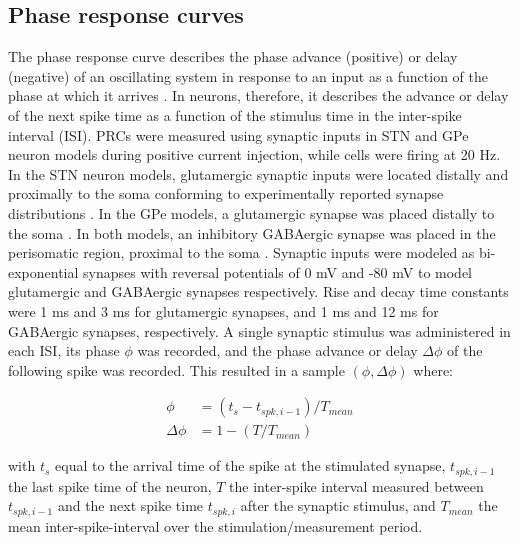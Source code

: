 \subsection{Phase response curves}
%

%
The phase response curve describes the phase advance (positive)
or delay (negative) of an oscillating system in response to an input as a function
of the phase at which it arrives \cite{gutkin_phase-response_2005}.
In neurons, therefore, it describes the advance or delay of the next spike time
as a function of the stimulus time in the inter-spike interval (ISI).
%
PRCs were measured using synaptic inputs in STN and GPe neuron models during
positive current injection, while cells were firing at 20 Hz.
%
In the STN neuron models, glutamergic synaptic inputs were located distally and
proximally to the soma conforming to experimentally reported synapse distributions \cite{bevan_glutamate-enriched_1995,mathai_reduced_2015,pan_neuronal_2016}. In the GPe
models, a glutamergic synapse was placed distally to the soma \cite{shink_differential_1995}.
In both models, an inhibitory GABAergic synapse was placed in the perisomatic region,
proximal to the soma \cite{smith_topographical_1990,chan_hcn2_2004,sadek_single-cell_2007}.
Synaptic inputs were modeled as bi-exponential synapses with reversal potentials of
0 mV and -80 mV to model glutamergic and GABAergic synapses respectively. Rise and decay
time constants were 1 ms and 3 ms for glutamergic synapses, and 1 ms and 12 ms for
GABAergic synapses, respectively.
%
A single synaptic stimulus was administered in each ISI, its phase $\phi$ was recorded,
and the phase advance or delay $\Delta \phi$ of the following spike was recorded.
This resulted in a sample $ (\phi, \Delta \phi)$ where:

%
%
%
\begin{align}
    \phi &= (t_s - t_{spk,i-1}) / T_{mean} \\
    \Delta \phi &= 1 - (T / T_{mean})
\label{eq:prc-samples}
\end{align}

with $t_s$ equal to the arrival time of the spike at the stimulated synapse,
$t_{spk,i-1}$ the last spike time of the neuron, $T$ the inter-spike interval measured
between $t_{spk,i-1}$ and the next spike time $t_{spk,i}$ after the synaptic stimulus,
and $T_{mean}$ the mean inter-spike-interval over the stimulation/measurement period.

